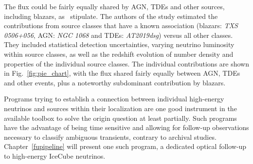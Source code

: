 The flux could be fairly equally shared by AGN, TDEs and other sources, including blazars, as~ stipulate. The authors of the study estimated the contributions from source classes that have a known association (blazars: \emph{TXS 0506+056}, AGN: \emph{NGC 1068} and TDEs: \emph{AT2019dsg}) versus all other classes. They included statistical detection uncertainties, varying neutrino luminosity within source classes, as well as the redshift evolution of number density and properties of the individual source classes. The individual contributions are shown in Fig.~\ref{fig:pie_chart}, with the flux shared fairly equally between AGN, TDEs and other events, plus a noteworthy subdominant contribution by blazars.

Programs trying to establish a connection between individual high-energy neutrinos and sources within their localization are one good instrument in the available toolbox to solve the origin question at least partially. Such programs have the advantage of being time sensitive and allowing for follow-up observations necessary to classify ambiguous transients, contrary to archival studies. Chapter~\ref{fupipeline} will present one such program, a dedicated optical follow-up to high-energy IceCube neutrinos.
